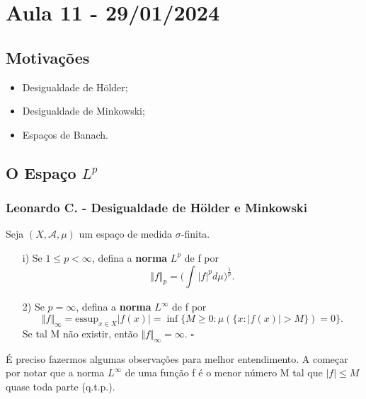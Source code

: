 \documentclass[measure_theory.tex]{subfiles}
\begin{document}
\section{Aula 11 - 29/01/2024}
\subsection{Motivações}
\begin{itemize}
	\item Desigualdade de Hölder;
	\item Desigualdade de Minkowski;
	\item Espaços de Banach.
\end{itemize}
\subsection{O Espaço \(L^{p}\)}
\subsubsection*{Leonardo C. - Desigualdade de Hölder e Minkowski}
\begin{def*}
	Seja \((X, \mathcal{A}, \mu )\) um espaço de medida \(\sigma \)-finita.
	\begin{itemize}
		\item[i)] Se \(1\leq p<\infty\), defina a \textbf{norma }\(L^{p}\) de f por
		      \[
			      \Vert f \Vert_{p}=\biggl(\int_{}^{}|f|^{p}d\mu \biggr)^{\frac{1}{p}}.
		      \]
		\item[2)] Se \(p=\infty\), defina a \textbf{norma }\(L^{\infty}\) de f por
		      \[
			      \Vert f \Vert_{\infty}=\mathrm{essup}_{x\in X}|f(x)| = \inf_{}\{M\geq 0: \mu (\{x:|f(x)|>M\})=0\}.
		      \]
		      Se tal M não existir, então \(\Vert f \Vert_{\infty} = \infty.\) \(\square\)
	\end{itemize}
\end{def*}
É preciso fazermos algumas observações para melhor entendimento. A começar por notar que a norma \(L^{\infty}\) de uma função f é o menor número M tal que \(|f|\leq M\) quase toda parte (q.t.p.).
\end{document}
